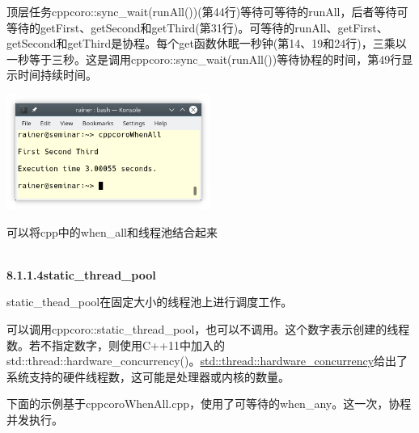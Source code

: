 顶层任务cppcoro::sync\_wait(runAll())(第44行)等待可等待的runAll，后者等待可等待的getFirst、getSecond和getThird(第31行)。可等待的runAll、getFirst、getSecond和getThird是协程。每个get函数休眠一秒钟(第14、19和24行)，三乘以一秒等于三秒。这是调用cppcoro::sync\_wait(runAll())等待协程的时间，第49行显示时间持续时间。

\begin{center}
\includegraphics[width=0.5\textwidth]{content/5/chapter8/images/5.png}\\
\end{center}

可以将cpp中的when\_all和线程池结合起来

\hspace*{\fill} \\ %
\noindent
\textbf{8.1.1.4\hspace{0.2cm}static\_thread\_pool}

static\_thead\_pool在固定大小的线程池上进行调度工作。

可以调用cppcoro::static\_thread\_pool，也可以不调用。这个数字表示创建的线程数。若不指定数字，则使用C++11中加入的std::thread::hardware\_concurrency()。\href{https://en.cppreference.com/w/cpp/thread/thread/hardware_concurrency}{std::thread::hardware\_concurrency}给出了系统支持的硬件线程数，这可能是处理器或内核的数量。

下面的示例基于cppcoroWhenAll.cpp，使用了可等待的when\_any。这一次，协程并发执行。

